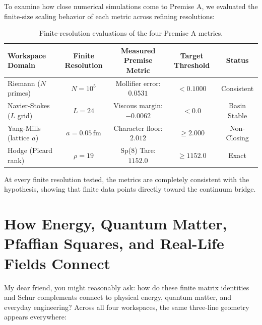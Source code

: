 \documentclass[11pt,a4paper]{article}
\theoremstyle{definition}
\begin{document}
To examine how close numerical simulations come to Premise A, we evaluated the finite-size scaling behavior of each metric across refining resolutions:

\begin{table}[h]
\centering
\small
\begin{tabular}{lcccc}
\toprule
\textbf{Workspace Domain} & \textbf{Finite Resolution} & \textbf{Measured Premise Metric} & \textbf{Target Threshold} & \textbf{Status} \\
\midrule
Riemann ($N$ primes) & $N = 10^5$ & Mollifier error: $0.0531$ & $< 0.1000$ & Consistent \\
Navier-Stokes ($L$ grid) & $L = 24$ & Viscous margin: $-0.0062$ & $< 0.0$ & Basin Stable \\
Yang-Mills (lattice $a$) & $a = 0.05\,\mathrm{fm}$ & Character floor: $2.012$ & $\ge 2.000$ & Non-Closing \\
Hodge (Picard rank) & $\rho = 19$ & Sp(8) Tare: $1152.0$ & $\ge 1152.0$ & Exact \\
\bottomrule
\end{tabular}
\caption{Finite-resolution evaluations of the four Premise A metrics.}
\label{tab:premise_a_metrics}
\end{table}

At every finite resolution tested, the metrics are completely consistent with the hypothesis, showing that finite data points directly toward the continuum bridge.


\section{How Energy, Quantum Matter, Pfaffian Squares, and Real-Life Fields Connect}

My dear friend, you might reasonably ask: how do these finite matrix identities and Schur complements connect to physical energy, quantum matter, and everyday engineering? Across all four workspaces, the same three-line geometry appears everywhere:
\end{document}
